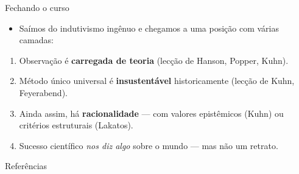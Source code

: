 \documentclass[aspectratio=169]{beamer}
\newcommand{\impt}[1]{\textcolor{maccent}{\textbf{#1}}}
\begin{document}
\begin{frame}{Fechando o curso}
\begin{itemize}
    \item Sa\'imos do indutivismo ing\^enuo e chegamos a uma posi\c c\~ao com v\'arias camadas:
\end{itemize}
\vspace{0.3cm}
\begin{enumerate}
    \item Observa\c c\~ao \'e \impt{carregada de teoria} (lec\c c\~ao de Hanson, Popper, Kuhn).
    \item M\'etodo \'unico universal \'e \impt{insustent\'avel} historicamente (lec\c c\~ao de Kuhn, Feyerabend).
    \item Ainda assim, h\'a \impt{racionalidade} --- com valores epist\^emicos (Kuhn) ou crit\'erios estruturais (Lakatos).
    \item Sucesso cient\'ifico \emph{nos diz algo} sobre o mundo --- mas n\~ao um retrato.
\end{enumerate}
\vspace{0.4cm}
\end{frame}


\begin{frame}[allowframebreaks]{Refer\^encias}
  
  
\end{frame}
\end{document}
